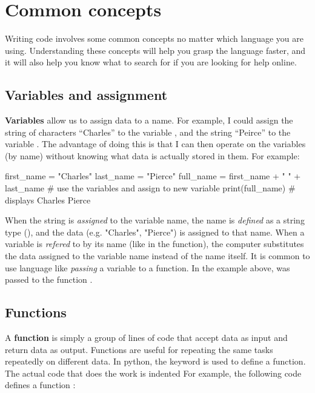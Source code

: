 \section{Common concepts}

Writing code involves some common concepts no matter which language you are using. Understanding these concepts will help you grasp the language faster, and it will also help you know what to search for if you are looking for help online.

\subsection{Variables and assignment}

\textbf{Variables} allow us to assign data to a name. For example, I could assign the string of characters ``Charles'' to the variable , and the string ``Peirce'' to the variable . The advantage of doing this is that I can then operate on the variables (by name) without knowing what data is actually stored in them. For example:

\begin{pycode}
    first_name = "Charles"
    last_name = "Pierce"
    full_name = first_name + " " + last_name # use the variables and assign to new variable
    print(full_name) # displays  Charles Pierce
\end{pycode}

When the string is \textit{assigned} to the variable name, the name is \textit{defined} as a string type (), and the data (e.g. "Charles", "Pierce") is assigned to that name. When a variable is \textit{refered} to by its name (like in the  function), the computer substitutes the data assigned to the variable name instead of the name itself. It is common to use language like \textit{passing} a variable to a function. In the example above,  was passed to the function .

\subsection{Functions}

A \textbf{function} is simply a group of lines of code that accept data as input and return data as output. Functions are useful for repeating the same tasks repeatedly on different data. In python, the  keyword is used to define a function. The actual code that does the work is indented For example, the following code defines a function :

